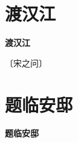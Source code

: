 \documentclass[12pt,UTF-8,openany,fontset=none]{ctexbook}
\begin{document}
\vspace{8pt}
\clearpage


\section{渡汉江}



\begin{center}
    {\bfseries 渡汉江}
\end{center}

\begin{center}
    \vspace{10pt}
    
    \begin{large}
        
        〔宋之问〕
        
    \end{large}
    
    \vspace{8pt}
    
    \begin{huge}
        
        \phantom{。}

        \phantom{。}
        
        \phantom{。}

        \phantom{。}
        
    \end{huge}
    
\end{center}

\vspace{8pt}
\clearpage


\section{题临安邸}



\begin{center}
    {\bfseries 题临安邸}
\end{center}
\end{document}
